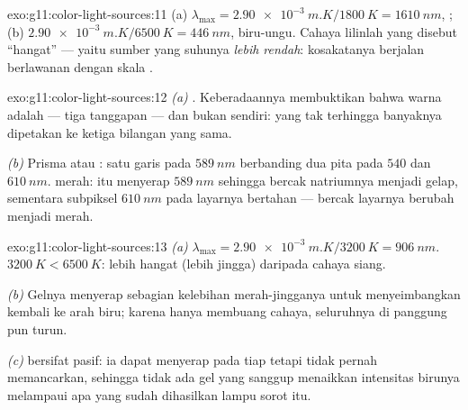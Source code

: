 \begin{solution}{exo:g11:color-light-sources:11}
(a) $\lambda_{\max} = \qty{2.90e-3}{m.K}/\qty{1800}{K}
= \qty{1610}{nm}$, ;
(b) $\qty{2.90e-3}{m.K}/\qty{6500}{K} = \qty{446}{nm}$, biru-ungu.
Cahaya lilinlah yang disebut ``hangat'' --- yaitu sumber yang suhunya
\emph{lebih rendah}: kosakatanya berjalan berlawanan dengan skala
.
\end{solution}

\begin{solution}{exo:g11:color-light-sources:12}
\emph{(a)} . Keberadaannya membuktikan bahwa warna adalah
 --- tiga tanggapan  --- dan bukan 
sendiri:  yang tak terhingga banyaknya dipetakan ke ketiga
bilangan yang sama.

\emph{(b)} Prisma atau : satu garis pada $\qty{589}{nm}$
berbanding dua pita pada $540$ dan $\qty{610}{nm}$.  merah:
 itu menyerap $\qty{589}{nm}$ sehingga bercak natriumnya menjadi
gelap, sementara subpiksel $\qty{610}{nm}$ pada layarnya bertahan ---
bercak layarnya berubah menjadi merah.
\end{solution}

\begin{solution}{exo:g11:color-light-sources:13}
\emph{(a)} $\lambda_{\max} = \qty{2.90e-3}{m.K}/\qty{3200}{K} =
\qty{906}{nm}$.  $\qty{3200}{K} < \qty{6500}{K}$: lebih
hangat (lebih jingga) daripada cahaya siang.

\emph{(b)} Gelnya menyerap sebagian kelebihan merah-jingganya untuk
menyeimbangkan kembali  ke arah biru; karena  hanya
membuang cahaya,  seluruhnya di panggung pun turun.

\emph{(c)}  bersifat pasif: ia dapat menyerap pada tiap  tetapi tidak pernah memancarkan, sehingga tidak ada gel yang
sanggup menaikkan intensitas birunya melampaui apa yang sudah
dihasilkan lampu sorot itu.
\end{solution}

